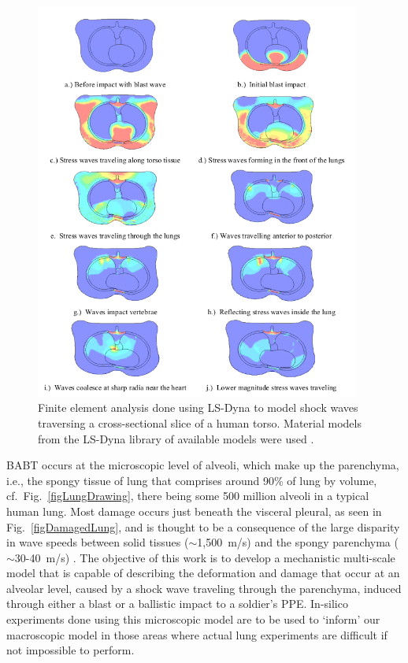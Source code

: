 \begin{figure}
    \centering
    \includegraphics[width=0.95\textwidth]{figures/shockWaveInTorso.png}
    \caption{Finite element analysis done using LS-Dyna to model shock waves traversing a cross-sectional slice of a human torso.  Material models from the LS-Dyna library of available models were used \cite{Josey10}.}
    \label{figShockWaveInLung}
\end{figure}

BABT occurs at the microscopic level of alveoli, which make up the parenchyma, i.e., the spongy tissue of lung that comprises around 90\% of lung by volume, cf.\ Fig.~\ref{figLungDrawing}, there being some 500 million alveoli in a typical human lung.  Most damage occurs just beneath the visceral pleural, as seen in Fig.~\ref{figDamagedLung}, and is thought to be a consequence of the large disparity in wave speeds between solid tissues ($\sim$1,500~m/s) and the spongy parenchyma ($\sim$30-40~m/s) \cite{Stuhmiller08}.  The objective of this work is to develop a mechanistic multi-scale model that is capable of describing the deformation and damage that occur at an alveolar level, caused by a shock wave traveling through the parenchyma, induced through either a blast or a ballistic impact to a soldier's PPE.  In-silico experiments done using this microscopic model are to be used to `inform' our macroscopic model in those areas where actual lung experiments are difficult if not impossible to perform.

